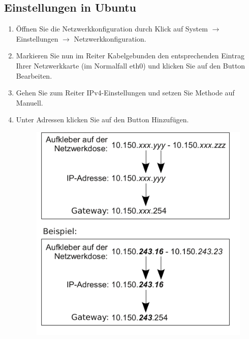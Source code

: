 \documentclass[a4paper,12pt]{scrartcl}
\begin{document}
\subsection*{Einstellungen in Ubuntu}
\begin{enumerate}
    \item Öffnen Sie die Netzwerkkonfiguration durch Klick auf System $\rightarrow$ Einstellungen $\rightarrow$ Netzwerkkonfiguration.
    \item Markieren Sie nun im Reiter Kabelgebunden den entsprechenden Eintrag Ihrer Netzwerkkarte (im Normalfall eth0) und klicken Sie auf den Button Bearbeiten.
    \item Gehen Sie zum Reiter IPv4-Einstellungen und setzen Sie Methode auf Manuell.
    \item Unter Adressen klicken Sie auf den Button Hinzufügen.
      \begin{figure}[h!]
        \centering
        \begin{minipage}[c]{0.45\linewidth}
          \centering
          \includegraphics[width=\linewidth,keepaspectratio]{Bilder/IP_Gerneric}
        \end{minipage}
        \begin{minipage}[c]{0.5\linewidth}
          \centering

\end{minipage}
\end{figure}
\end{enumerate}
\end{document}
